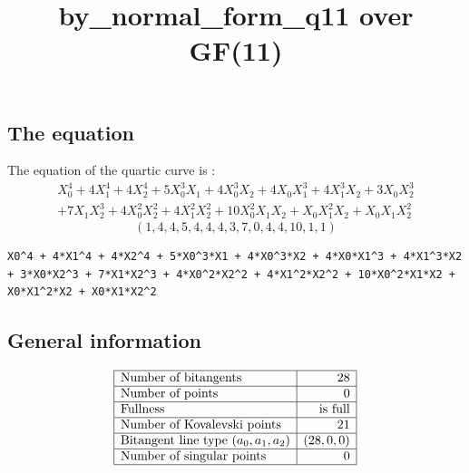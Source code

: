 \documentclass{article}
\newcommand\setTBstruts{\def\T{\rule{0pt}{2.6ex}}%
\def\B{\rule[-1.2ex]{0pt}{0pt}}}
\begin{document}
 
\setTBstruts



{\allowdisplaybreaks%






\title{by\_normal\_form\_q11 over GF(11)}
\author{}%
\maketitle%
%



\subsection*{The equation}
The equation of the quartic curve  is :
$$
\begin{array}{c}
X_0^4 + 4X_1^4 + 4X_2^4 + 5X_0^3X_1 + 4X_0^3X_2 + 4X_0X_1^3 + 4X_1^3X_2 + 3X_0X_2^3\\
 + 7X_1X_2^3 + 4X_0^2X_2^2 + 4X_1^2X_2^2 + 10X_0^2X_1X_2 + X_0X_1^2X_2 + X_0X_1X_2^2\end{array}
$$
$$
( 1, 4, 4, 5, 4, 4, 4, 3, 7, 0, 4, 4, 10, 1, 1 )$$
\begin{verbatim}
X0^4 + 4*X1^4 + 4*X2^4 + 5*X0^3*X1 + 4*X0^3*X2 + 4*X0*X1^3 + 4*X1^3*X2 + 3*X0*X2^3 + 7*X1*X2^3 + 4*X0^2*X2^2 + 4*X1^2*X2^2 + 10*X0^2*X1*X2 + X0*X1^2*X2 + X0*X1*X2^2
\end{verbatim}
\subsection*{General information}
{\renewcommand{\arraystretch}{1.5}
$$
\begin{array}{|l|r|}
\hline
\mbox{Number of bitangents} & 28\\
\hline
\mbox{Number of points} & 0\\
\hline
\mbox{Fullness} &  \mbox{is full}\\
\hline
\mbox{Number of Kovalevski points} & 21\\
\hline
\mbox{Bitangent line type $(a_0,a_1,a_2)$} & (28,
0,
0)\\
\hline
\mbox{Number of singular points} & 0\\
\hline
\end{array}
$$}
}
\end{document}
